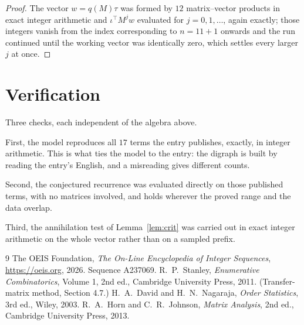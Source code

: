 \documentclass[11pt,a4paper]{article}
\theoremstyle{plain}
\theoremstyle{definition}
\begin{document}
\begin{proof}
The vector $w=q(M)\tau$ was formed by $12$ matrix--vector products in exact integer
arithmetic and $\iota^{\!\top}M^{j}w$ evaluated for $j=0,1,\dots$, again exactly; those
integers vanish from the index corresponding to $n=11+1$ onwards and the run continued
until the working vector was identically zero, which settles every larger $j$ at once.
\end{proof}

\section{Verification}

Three checks, each independent of the algebra above.

First, the model reproduces all $17$ terms the entry publishes, exactly, in integer
arithmetic. This is what ties the model to the entry: the digraph is built by reading the
entry's English, and a misreading gives different counts.

Second, the conjectured recurrence was evaluated directly on those published terms, with no
matrices involved, and holds wherever the proved range and the data overlap.

Third, the annihilation test of Lemma~\ref{lem:crit} was carried out in exact integer
arithmetic on the whole vector rather than on a sampled prefix.

\begin{thebibliography}{9}
 The OEIS Foundation, \emph{The On-Line Encyclopedia of Integer
Sequences}, \url{https://oeis.org}, 2026. Sequence A237069.
 R.~P.~Stanley, \emph{Enumerative Combinatorics}, Volume 1, 2nd ed.,
Cambridge University Press, 2011. (Transfer-matrix method, Section 4.7.)
 H.~A.~David and H.~N.~Nagaraja, \emph{Order Statistics}, 3rd ed., Wiley,
2003.
 R.~A.~Horn and C.~R.~Johnson, \emph{Matrix Analysis}, 2nd ed., Cambridge
University Press, 2013.
\end{thebibliography}
\end{document}

